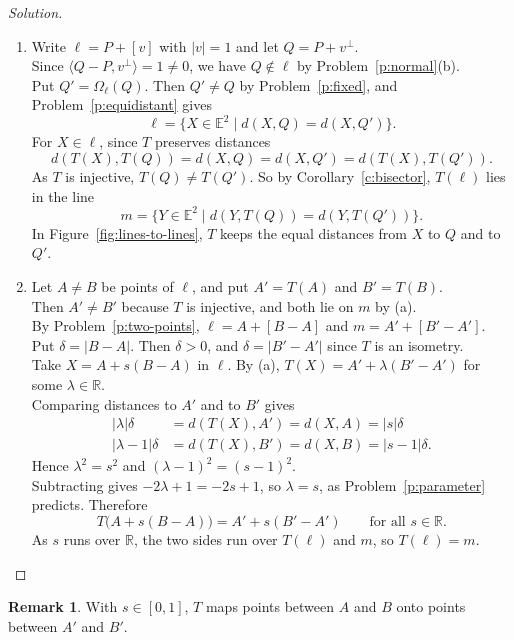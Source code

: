 \documentclass[11pt,a4paper]{article}
\theoremstyle{boxed}
\theoremstyle{definition}
\newtheorem*{remark}{Remark}
\newenvironment{solution}{\begin{proof}[Solution]}{\end{proof}}
\newcommand{\R}{\mathbb{R}}
\newcommand{\E}{\mathbb{E}^2}
\newcommand{\ip}[2]{\langle #1, #2 \rangle}
\newcommand{\abs}[1]{\lvert #1 \rvert}
\begin{document}
\begin{solution}
\leavevmode
\begin{enumerate}
    \item Write $\ell=P+[v]$ with $\abs{v}=1$ and let $Q=P+v^\perp$.\\
    Since $\ip{Q-P}{v^\perp}=1\neq0$, we have $Q\notin\ell$ by Problem~\ref{p:normal}(b).\\
    Put $Q'=\Omega_\ell(Q)$. Then $Q'\neq Q$ by Problem~\ref{p:fixed}, and Problem~\ref{p:equidistant} gives
    \[
    \ell=\{X\in\E \mid d(X,Q)=d(X,Q')\}.
    \]
    For $X\in\ell$, since $T$ preserves distances
    \[
    d(T(X),T(Q))=d(X,Q)=d(X,Q')=d(T(X),T(Q')).
    \]
    As $T$ is injective, $T(Q)\neq T(Q')$. So by Corollary~\ref{c:bisector}, $T(\ell)$ lies in the line
    \[
    m=\{Y\in\E \mid d(Y,T(Q))=d(Y,T(Q'))\}.
    \]
    In Figure~\ref{fig:lines-to-lines}, $T$ keeps the equal distances from $X$ to $Q$ and to $Q'$.
    \item Let $A\neq B$ be points of $\ell$, and put $A'=T(A)$ and $B'=T(B)$.\\
    Then $A'\neq B'$ because $T$ is injective, and both lie on $m$ by (a).\\
    By Problem~\ref{p:two-points}, $\ell=A+[B-A]$ and $m=A'+[B'-A']$.\\
    Put $\delta=\abs{B-A}$. Then $\delta>0$, and $\delta=\abs{B'-A'}$ since $T$ is an isometry.\\
    Take $X=A+s(B-A)$ in $\ell$. By (a), $T(X)=A'+\lambda(B'-A')$ for some $\lambda\in\R$.\\
    Comparing distances to $A'$ and to $B'$ gives
    \begin{align*}
    \abs{\lambda}\delta &= d(T(X),A')=d(X,A)=\abs{s}\delta\\
    \abs{\lambda-1}\delta &= d(T(X),B')=d(X,B)=\abs{s-1}\delta.
    \end{align*}
    Hence $\lambda^2=s^2$ and $(\lambda-1)^2=(s-1)^2$.\\
    Subtracting gives $-2\lambda+1=-2s+1$, so $\lambda=s$, as Problem~\ref{p:parameter} predicts. Therefore
    \[
    T\bigl(A+s(B-A)\bigr)=A'+s(B'-A') \qquad\text{for all } s\in\R.
    \]
    As $s$ runs over $\R$, the two sides run over $T(\ell)$ and $m$, so $T(\ell)=m$. \qedhere
\end{enumerate}
\end{solution}

\begin{remark}
With $s\in[0,1]$, $T$ maps points between $A$ and $B$ onto points between $A'$ and $B'$.
\end{remark}
\end{document}

